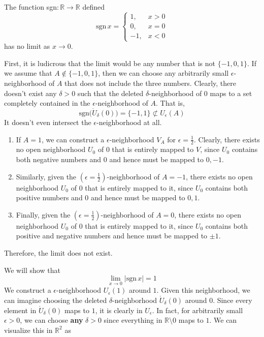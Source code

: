   \begin{example}
    The function sgn$: \mathbb{R} \longrightarrow \mathbb{R}$ defined
    \begin{equation}
      \text{sgn}\,x = \begin{cases} 1, & x > 0 \\ 0, & x = 0 \\ -1, & x < 0 \end{cases}
    \end{equation}
    has no limit as $x \rightarrow 0$. 

    First, it is ludicrous that the limit would be any number that is not $\{-1, 0, 1\}$. If we assume that $A \not\in \{-1,0,1\}$, then we can choose any arbitrarily small $\epsilon$-neighborhood of $A$ that does not include the three numbers. Clearly, there doesn't exist any $\delta>0$ such that the deleted $\delta$-neighborhood of $0$ maps to a set completely contained in the $\epsilon$-neighborhood of $A$. That is,
    \begin{equation}
      \text{sgn}\big( \mathring{U}_\delta (0)\big) = \{-1,1\} \not\subset U_\epsilon (A)
    \end{equation}
    It doesn't even intersect the $\epsilon$-neighborhood at all. 
    \begin{enumerate}
      \item If $A = 1$, we can construct a $\epsilon$-neighborhood $V_A$ for $\epsilon = \frac{1}{2}$. Clearly, there exists no open neighborhood $U_0$ of $0$ that is entirely mapped to $V$, since $U_0$ contains both negative numbers and $0$ and hence must be mapped to $0, -1$. 
      \item Similarly, given the $(\epsilon=\frac{1}{2})$-neighborhood of $A = -1$, there exists no open neighborhood $U_0$ of $0$ that is entirely mapped to it, since $U_0$ contains both positive numbers and $0$ and hence must be mapped to $0, 1$. 
      \item Finally, given the $(\epsilon=\frac{1}{2})$-neighborhood of $A = 0$, there exists no open neighborhood $U_0$ of $0$ that is entirely mapped to it, since $U_0$ contains both positive and negative numbers and hence must be mapped to $\pm1$. 
    \end{enumerate}
    Therefore, the limit does not exist. 
  \end{example}

  \begin{example}
    We will show that 
    \begin{equation}
      \lim_{x \rightarrow 0} |\text{sgn}\,x| = 1
    \end{equation}
    We construct a $\epsilon$-neighborhood $U_\epsilon (1)$ around $1$. Given this neighborhood, we can imagine choosing the deleted $\delta$-neighborhood $\mathring{U}_\delta (0)$ around $0$. Since every element in $\mathring{U}_\delta (0)$ maps to $1$, it is clearly in $U_\epsilon$. In fact, for arbitrarily small $\epsilon > 0$, we can choose \textbf{any} $\delta>0$ since everything in $\mathbb{R} \setminus 0$ maps to $1$. We can visualize this in $\mathbb{R}^2$ as
  \end{example}

